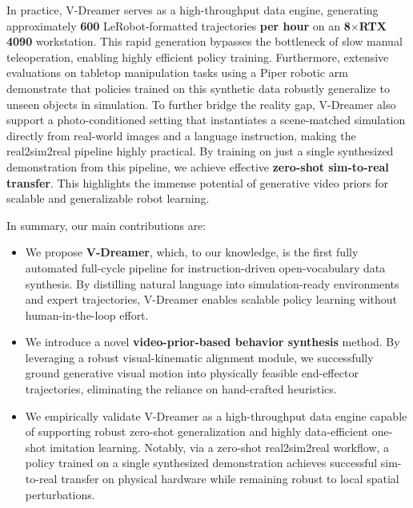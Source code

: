 In practice, V-Dreamer serves as a high-throughput data engine, generating approximately \textbf{600} LeRobot-formatted trajectories \textbf{per hour} on an \textbf{8$\times$RTX 4090} workstation. This rapid generation bypasses the bottleneck of slow manual teleoperation, enabling highly efficient policy training. Furthermore, extensive evaluations on tabletop manipulation tasks using a Piper robotic arm demonstrate that policies trained on this synthetic data robustly generalize to unseen objects in simulation. To further bridge the reality gap, V-Dreamer also support a photo-conditioned setting that instantiates a scene-matched simulation directly from real-world images and a language instruction, making the real2sim2real pipeline highly practical. By training on just a single synthesized demonstration from this pipeline, we achieve effective \textbf{zero-shot sim-to-real transfer}. This highlights the immense potential of generative video priors for scalable and generalizable robot learning.

In summary, our main contributions are:
\begin{itemize}
    \item We propose \textbf{V-Dreamer}, which, to our knowledge, is the first fully automated full-cycle pipeline for instruction-driven open-vocabulary data synthesis. By distilling natural language into simulation-ready environments and expert trajectories, V-Dreamer enables scalable policy learning without human-in-the-loop effort.
    \item We introduce a novel \textbf{video-prior-based behavior synthesis} method. By leveraging a robust visual-kinematic alignment module, we successfully ground generative visual motion into physically feasible end-effector trajectories, eliminating the reliance on hand-crafted heuristics.
    \item We empirically validate V-Dreamer as a high-throughput data engine capable of supporting robust zero-shot generalization and highly data-efficient one-shot imitation learning. Notably, via a zero-shot real2sim2real workflow, a policy trained on a single synthesized demonstration achieves successful sim-to-real transfer on physical hardware while remaining robust to local spatial perturbations.
\end{itemize}
